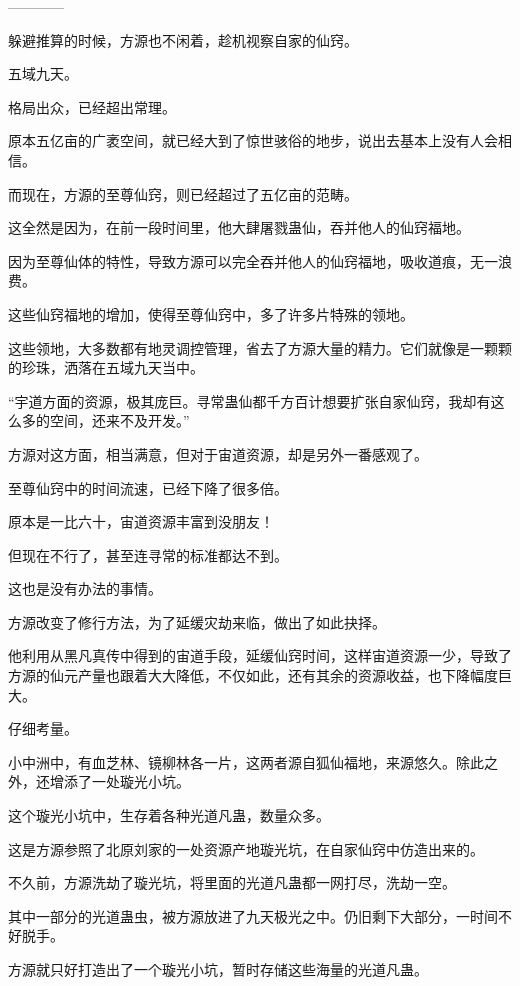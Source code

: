 
\begin{this_body}

------------

躲避推算的时候，方源也不闲着，趁机视察自家的仙窍。

五域九天。

格局出众，已经超出常理。

原本五亿亩的广袤空间，就已经大到了惊世骇俗的地步，说出去基本上没有人会相信。

而现在，方源的至尊仙窍，则已经超过了五亿亩的范畴。

这全然是因为，在前一段时间里，他大肆屠戮蛊仙，吞并他人的仙窍福地。

因为至尊仙体的特性，导致方源可以完全吞并他人的仙窍福地，吸收道痕，无一浪费。

这些仙窍福地的增加，使得至尊仙窍中，多了许多片特殊的领地。

这些领地，大多数都有地灵调控管理，省去了方源大量的精力。它们就像是一颗颗的珍珠，洒落在五域九天当中。

“宇道方面的资源，极其庞巨。寻常蛊仙都千方百计想要扩张自家仙窍，我却有这么多的空间，还来不及开发。”

方源对这方面，相当满意，但对于宙道资源，却是另外一番感观了。

至尊仙窍中的时间流速，已经下降了很多倍。

原本是一比六十，宙道资源丰富到没朋友！

但现在不行了，甚至连寻常的标准都达不到。

这也是没有办法的事情。

方源改变了修行方法，为了延缓灾劫来临，做出了如此抉择。

他利用从黑凡真传中得到的宙道手段，延缓仙窍时间，这样宙道资源一少，导致了方源的仙元产量也跟着大大降低，不仅如此，还有其余的资源收益，也下降幅度巨大。

仔细考量。

小中洲中，有血芝林、镜柳林各一片，这两者源自狐仙福地，来源悠久。除此之外，还增添了一处璇光小坑。

这个璇光小坑中，生存着各种光道凡蛊，数量众多。

这是方源参照了北原刘家的一处资源产地璇光坑，在自家仙窍中仿造出来的。

不久前，方源洗劫了璇光坑，将里面的光道凡蛊都一网打尽，洗劫一空。

其中一部分的光道蛊虫，被方源放进了九天极光之中。仍旧剩下大部分，一时间不好脱手。

方源就只好打造出了一个璇光小坑，暂时存储这些海量的光道凡蛊。


\end{this_body}
